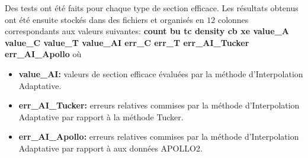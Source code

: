 \hspace{0.5cm}
Des tests ont été faits pour chaque type de section efficace. Les résultats obtenus ont été ensuite stockés dans des fichiers et organisés en $12$ colonnes correspondants aux valeurs suivantes: \textbf{count bu tc density cb xe value\_A value\_C value\_T value\_AI err\_C err\_T err\_AI\_Tucker err\_AI\_Apollo} où
\begin{itemize}
\item \textbf{value\_AI:} valeurs de section efficace évaluées par la méthode d'Interpolation Adaptative.
\item \textbf{err\_AI\_Tucker:} erreurs relatives commises par la méthode d'Interpolation Adaptative par rapport à la méthode Tucker.
\item \textbf{err\_AI\_Apollo:} erreurs relatives commises par la méthode d'Interpolation Adaptative par rapport à aux données APOLLO2.
\end{itemize}

